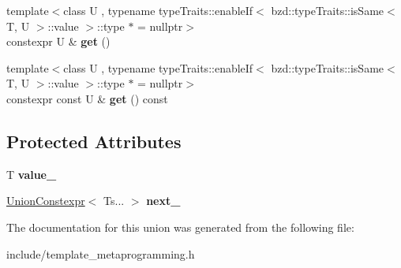 \begin{DoxyCompactItemize}
\item 
\mbox{\label{unionbzd_1_1tmp_1_1impl_1_1UnionConstexpr_a4d6d4b30a5bc9f1cd58a07254dd57b4d}} 
{\footnotesize template$<$class U , typename type\+Traits\+::enable\+If$<$ bzd\+::type\+Traits\+::is\+Same$<$ T, U $>$\+::value $>$\+::type $\ast$  = nullptr$>$ }\\constexpr U \& {\bfseries get} ()
\item 
\mbox{\label{unionbzd_1_1tmp_1_1impl_1_1UnionConstexpr_a32da9f21eb5119dc07b78aafd7484015}} 
{\footnotesize template$<$class U , typename type\+Traits\+::enable\+If$<$ bzd\+::type\+Traits\+::is\+Same$<$ T, U $>$\+::value $>$\+::type $\ast$  = nullptr$>$ }\\constexpr const U \& {\bfseries get} () const
\end{DoxyCompactItemize}
\subsection*{Protected Attributes}
\begin{DoxyCompactItemize}
\item 
\mbox{\label{unionbzd_1_1tmp_1_1impl_1_1UnionConstexpr_aacae828288ffeed37afbcf735cc147e9}} 
T {\bfseries value\+\_\+}
\item 
\mbox{\label{unionbzd_1_1tmp_1_1impl_1_1UnionConstexpr_a252246dacfdfdb9c6b610015c5999201}} 
\hyperlink{unionbzd_1_1tmp_1_1impl_1_1UnionConstexpr}{Union\+Constexpr}$<$ Ts... $>$ {\bfseries next\+\_\+}
\end{DoxyCompactItemize}


The documentation for this union was generated from the following file\+:\begin{DoxyCompactItemize}
\item 
include/template\+\_\+metaprogramming.\+h\end{DoxyCompactItemize}
